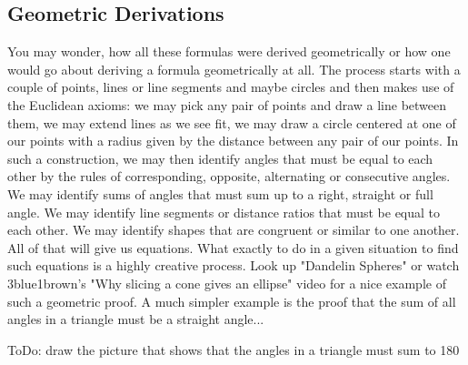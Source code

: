 \subsection{Geometric Derivations}
You may wonder, how all these formulas were derived geometrically or how one would go about deriving a formula geometrically at all. The process starts with a couple of points, lines or line segments and maybe circles and then makes use of the Euclidean axioms: we may pick any pair of points and draw a line between them, we may extend lines as we see fit, we may draw a circle centered at one of our points with a radius given by the distance between any pair of our points. In such a construction, we may then identify angles that must be equal to each other by the rules of corresponding, opposite, alternating or consecutive angles. We may identify sums of angles that must sum up to a right, straight or full angle. We may identify line segments or distance ratios that must be equal to each other. We may identify shapes that are congruent or similar to one another. All of that will give us equations. What exactly to do in a given situation to find such equations is a highly creative process. Look up "Dandelin Spheres" or watch 3blue1brown's "Why slicing a cone gives an ellipse" video for a nice example of such a geometric proof. A much simpler example is the proof that the sum of all angles in a triangle must be a straight angle...


ToDo: draw the picture that shows that the angles in a triangle must sum to 180

